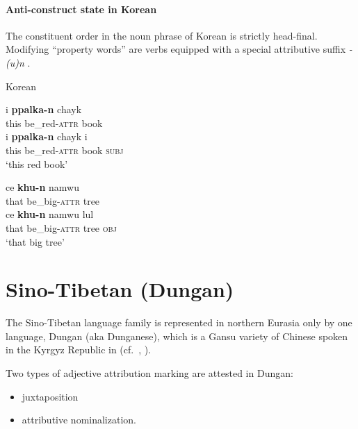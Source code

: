 \paragraph*{Anti\hyp{}construct state in Korean}
The constituent order in the noun phrase of Korean is strictly head-final. Modifying “property words” are verbs equipped with a special attributive suffix \textit{-(u)n} \citep{martin-etal1969}.
\begin{exe}
\ex \rm{Korean \citep[61]{chang1996}}
\begin{xlist}
\ex
\begin{xlist}
\ex
\gll	i \textbf{ppalka-n} chayk\\
	this be\_red-\textsc{attr} book\\
\ex	
\gll	i \textbf{ppalka-n} chayk i\\
	this be\_red-\textsc{attr} book \textsc{subj}\\
\glt	‘this red book’
\end{xlist}
\ex
\begin{xlist}
\ex	
\gll	ce \textbf{khu-n} namwu\\
	that be\_big-\textsc{attr} tree\\
\ex
\gll	ce \textbf{khu-n} namwu lul\\
	that be\_big-\textsc{attr} tree \textsc{obj}\\
\glt	‘that big tree’
\end{xlist}
\end{xlist}
\end{exe}

\section{Sino-Tibetan (Dungan)}
\label{sinotibetan synchr}
The Sino-Tibetan language family is represented in northern Eurasia only by one language, Dungan (aka Dunganese), which is a Gansu variety of Chinese spoken in the Kyrgyz Republic in  (cf.~\citealt[85]{yuo2003}, \citealt{kalimov1968}).

Two types of adjective attribution marking are attested in Dungan:
\begin{itemize}
\item juxtaposition
\item attributive nominalization.
\end{itemize}

